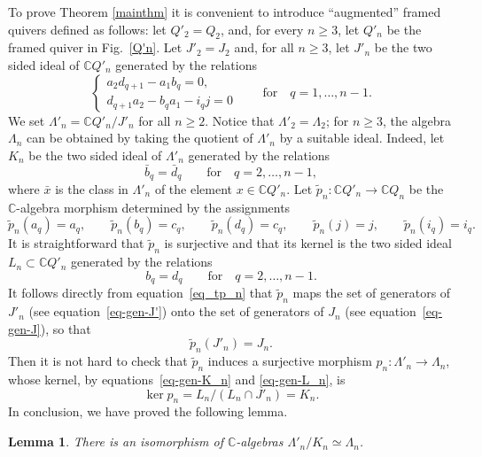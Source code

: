 \documentclass[11pt]{article}
\numberwithin{equation}{section}
\numberwithin{equation}{section}
\newtheorem{Lemma}[Theorem]{Lemma}
\begin{document}
To prove Theorem \ref{mainthm} it is convenient to introduce ``augmented'' framed quivers defined as follows:
let $Q'_{2}= Q_2$, and, for every $n\geq 3$, let $Q'_{n}$ be the framed quiver in Fig.~\ref{Q'n}. Let $J'_{2}= J_2$ and, for all $n\geq 3$, let $J'_{n}$ be the two sided ideal of $\mathbb{C} Q'_{n}$ generated by the relations
\begin{equation}
\begin{cases}
a_2d_{q+1}-a_1b_q =0, \\
d_{q+1}a_2-b_qa_1-i_qj =0
\end{cases}\qquad\text{for}\quad q=1,\dots,n-1 .
\label{eq-gen-J'}
\end{equation}
We set $\Lambda'_{n}=\mathbb{C} Q'_{n}/J'_{n}$ for all $n\geq2$. Notice that $\Lambda'_{2}=\Lambda_{2}$;
for $n\geq 3$, the algebra $\Lambda_{n}$ can be obtained by taking the quotient of $\Lambda'_{n}$ by a suitable ideal.
Indeed, let $K_{n}$ be the two sided ideal of $\Lambda'_{n}$ generated by the relations
\begin{equation}
\bar{b}_{q}=\bar{d}_q\qquad\text{for}\quad q=2,\dots, n-1 ,\label{eq-gen-K_n}
\end{equation}
where $\bar{x}$ is the class in $\Lambda'_{n}$ of the element $x \in \mathbb{C} Q'_{n}$.
Let $\tilde{p}_{n}\colon\mathbb{C} Q'_{n}\longrightarrow\mathbb{C} Q_{n}$ be the $\mathbb{C}$-algebra morphism determined by the assignments
\begin{equation}\label{eq_tp_n}
\tilde{p}_{n}(a_q) = a_q , \qquad \tilde{p}_{n}(b_q) = c_q ,\qquad \tilde{p}_{n}(d_q) = c_{q} ,\qquad
\tilde{p}_{n}(j) = j , \qquad \tilde{p}_{n}(i_q) = i_q .
\end{equation}
It is straightforward that $\tilde{p}_{n}$ is surjective and that its kernel is the two sided ideal $L_{n}\subset \mathbb{C} Q'_{n}$ generated by the relations
\begin{equation}
b_{q}=d_{q}\qquad\text{for}\quad q=2,\dots,n-1 .
\label{eq-gen-L_n}
\end{equation}
It follows directly from equation~\eqref{eq_tp_n} that $\tilde{p}_n$ maps the set of generators of $J'_n$ (see equation~\eqref{eq-gen-J'}) onto the set of generators of $J_n$ (see equation~\eqref{eq-gen-J}), so that
\begin{equation*}
\tilde{p}_{n}(J'_{n}) =J_{n} .
\end{equation*}
Then it is not hard to check that $\tilde{p}_{n}$ induces a surjective morphism $p_n\colon \Lambda'_n \to \Lambda_n$,
whose kernel, by equations~\eqref{eq-gen-K_n} and \eqref{eq-gen-L_n}, is
\begin{equation*}
\ker p_{n}= L_{n}/(L_{n}\cap J'_{n})=K_{n} .
\end{equation*}
In conclusion, we have proved the following lemma.
\begin{Lemma}\label{lm-Lambda'-->>Lambda}
There is an isomorphism of $\mathbb{C}$-algebras $\Lambda'_{n}/K_{n}\simeq \Lambda_{n}$.
\end{Lemma}
\end{document}

